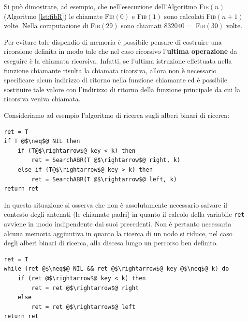 \begin{example}
	Si può dimostrare, ad esempio, che nell'esecuzione dell'Algoritmo \textsc{Fib}$(n)$ (Algoritmo \ref{lst:fibR}) le chiamate \textsc{Fib}$(0)$ e \textsc{Fib}$(1)$ sono calcolati \textsc{Fib}$(n+1)$ volte. Nella computazione di \textsc{Fib}$(29)$ sono chiamati $832040 = $ \textsc{Fib}$(30)$ volte.
	\begin{center}
	\end{center}
\end{example}
Per evitare tale dispendio di memoria è possibile pensare di costruire una ricorsione definita in modo tale che nel caso ricorsivo l'\textbf{ultima operazione} da eseguire è la chiamata ricorsiva. Infatti, se l'ultima istruzione effettuata nella funzione chiamante risulta la chiamata ricorsiva, allora non è necessario specificare alcun indirizzo di ritorno nella funzione chiamante ed è possibile sostituire tale valore con l'indirizzo di ritorno della funzione principale da cui la ricorsiva veniva chiamata.

Consideriamo ad esempio l'algoritmo di ricerca sugli alberi binari di ricerca:
\begin{lstlisting}[language=asd,caption={\textsc{SearchABR}(T,k)}]
ret = T
if T @$\neq$@ NIL then
	if (T@$\rightarrow$@ key < k) then
		ret = SearchABR(T @$\rightarrow$@ right, k)
	else if (T@$\rightarrow$@ key > k) then
		ret = SearchABR(T @$\rightarrow$@ left, k)
return ret
\end{lstlisting}
In questa situazione si osserva che non è assolutamente necessario salvare il contesto degli antenati (le chiamate padri) in quanto il calcolo della variabile \texttt{ret} avviene in modo indipendente dai suoi precedenti. Non è pertanto necessaria alcuna memoria aggiuntiva in quanto la ricerca di un nodo si riduce, nel caso degli alberi binari di ricerca, alla discesa lungo un percorso ben definito.

\begin{lstlisting}[language=asd,caption={\textsc{SearchABR\_Iter}(T,k)}]
ret = T
while (ret @$\neq$@ NIL && ret @$\rightarrow$@ key @$\neq$@ k) do
	if (ret @$\rightarrow$@ key < k) then
		ret = ret @$\rightarrow$@ right
	else
		ret = ret @$\rightarrow$@ left
return ret
\end{lstlisting}

